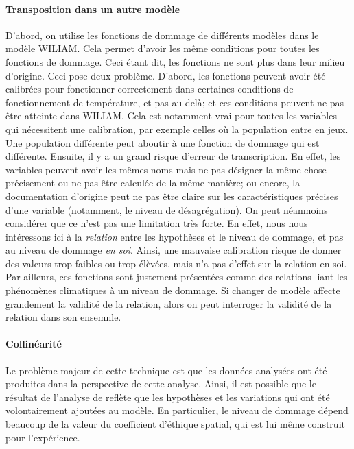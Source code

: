 \paragraph{Transposition dans un autre modèle} D'abord, on utilise les fonctions de dommage de différents modèles dans le modèle WILIAM. Cela permet d'avoir les même conditions pour toutes les fonctions de dommage. Ceci étant dit, les fonctions ne sont plus dans leur milieu d'origine. Ceci pose deux problème. D'abord, les fonctions peuvent avoir été calibrées pour fonctionner correctement dans certaines conditions de fonctionnement de température, et pas au delà; et ces conditions peuvent ne pas être atteinte dans WILIAM. Cela est notamment vrai pour toutes les variables qui nécessitent une calibration, par exemple celles où la population entre en jeux. Une population différente peut aboutir à une fonction de dommage qui est différente. Ensuite, il y a un grand risque d'erreur de transcription. En effet, les variables peuvent avoir les mêmes noms mais ne pas désigner la même chose précisement ou ne pas être calculée de la même manière; ou encore, la documentation d'origine peut ne pas être claire sur les caractéristiques précises d'une variable (notamment, le niveau de désagrégation). On peut néanmoins considérer que ce n'est pas une limitation très forte. En effet, nous nous intéressons ici à la \emph{relation} entre les hypothèses et le niveau de dommage, et pas au niveau de dommage \emph{en soi}. Ainsi, une mauvaise calibration risque de donner des valeurs trop faibles ou trop élèvées, mais n'a pas d'effet sur la relation en soi. Par ailleurs, ces fonctions sont justement présentées comme des relations liant les phénomènes climatiques à un niveau de dommage. Si changer de modèle affecte grandement la validité de la relation, alors on peut interroger la validité de la relation dans son ensemnle. 

\paragraph{Collinéarité} Le problème majeur de cette technique est que les données analysées ont été produites dans la perspective de cette analyse. Ainsi, il est possible que le résultat de l'analyse de reflète que les hypothèses et les variations qui ont été volontairement ajoutées au modèle. En particulier, le niveau de dommage dépend beaucoup de la valeur du coefficient d'éthique spatial, qui est lui même construit pour l'expérience. 



